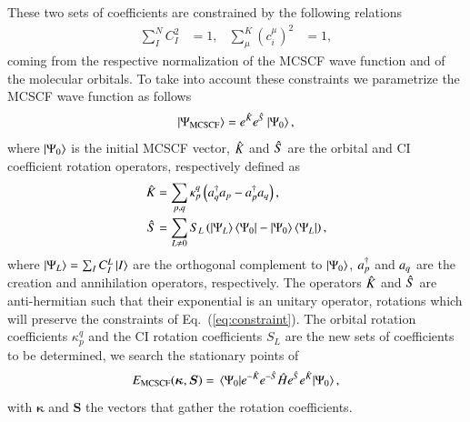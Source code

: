 \documentclass[aps,prb,reprint,showkeys,superscriptaddress]{revtex4-1}
\begin{document}
These two sets of coefficients are constrained by the following relations
\begin{align}
  \label{eq:constraint}
  \sum_I^N C^2_I &= 1, & \sum^K_\mu (c_i^\mu)^2 &= 1,
\end{align}
coming from the respective normalization of the MCSCF wave function and of the molecular orbitals.
To take into account these constraints we parametrize the MCSCF wave function as follows
\begin{equation}
  \label{eq:mcscf_wf}
  \ket{\Psi_{\text{MCSCF}}}=e^{\Hat{K}}e^{\Hat{S}}\ket{\Psi_0},
\end{equation}
where $\ket{\Psi_0}$ is the initial MCSCF vector, $\Hat{K}$ and $\Hat{S}$ are the orbital and CI coefficient rotation operators, respectively defined as
\begin{align}
  \Hat{K} &= \sum_{p,q} \kappa_p^q \left( a_{q}^\dagger a_{p} - a_{p}^\dagger a_{q} \right),  \\
  \Hat{S} &= \sum_{L \neq 0} S_{L}\left(\ket{\Psi_L}\bra{\Psi_0}-\ket{\Psi_0}\bra{\Psi_L}\right),
\end{align}
where $\ket{\Psi_{L}} = \sum_I C_I^L\ket{I} $ are the orthogonal complement to $\ket{\Psi_0}$, $a_{p}^\dagger$ and $a_{q}$ are the creation and annihilation operators, respectively.
The operators $\Hat{K}$ and $\Hat{S}$ are anti-hermitian such that their exponential is an unitary operator, \ie rotations which will preserve the constraints of Eq.~(\ref{eq:constraint}).
The orbital rotation coefficients $\kappa_p^q$ and the CI rotation coefficients $S_{L}$ are the new sets of coefficients to be determined, \ie we search the stationary points of
\begin{equation}
  \label{eq:mcscf_nrj}
  E_{\text{MCSCF}}(\bm{\kappa},\bm{S}) = \mel{\Psi_0}{e^{-\Hat{K}}e^{-\Hat{S}} \Hat{H}e^{\Hat{S}}e^{\Hat{K}}}{\Psi_0},
\end{equation}
with $\bm{\kappa}$ and $\bm{S}$ the vectors that gather the rotation coefficients.
\end{document}

